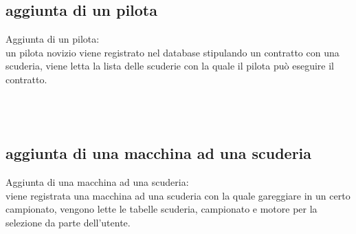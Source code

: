 \documentclass[a4paper,12pt]{report}
\begin{document}
	\subsection{aggiunta di un pilota}
	Aggiunta di un pilota:\\
	un pilota novizio viene registrato nel database stipulando un contratto con una scuderia,
	viene letta la lista delle scuderie con la quale il pilota può eseguire il contratto.
	\begin{table}[!htb]
		\centering
		\begin{center}
		\end{center}
	\end{table}\\\\
	\subsection{aggiunta di una macchina ad una scuderia}
	Aggiunta di una macchina ad una scuderia:\\
	viene registrata una macchina ad una scuderia con la quale gareggiare in un certo campionato,
	vengono lette le tabelle scuderia, campionato e motore per la selezione da parte dell'utente.
	\begin{table}[!htb]
		\centering
		\begin{center}
		\end{center}
	\end{table}\\
	\newpage
\end{document}
